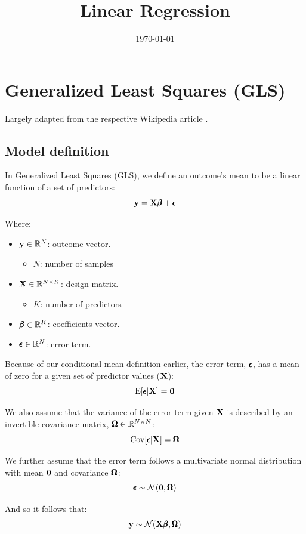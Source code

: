 \documentclass[12pt]{article}
\title{Linear Regression}
\date{\today}
\begin{document}
\maketitle

\section{Generalized Least Squares (GLS)}

Largely adapted from the respective Wikipedia article \citep{wikipedia2026webGLS}.

\subsection{Model definition}

In Generalized Least Squares (GLS), we define an outcome's mean to be a linear function of a set of predictors:
$$ \mathbf{y} = \mathbf{X} \pmb{\beta} + \pmb{\epsilon} $$

Where:

\begin{itemize}
    \item $\mathbf{y} \in \mathbb{R}^N$: outcome vector.
    \begin{itemize}
        \item $N$: number of samples
    \end{itemize}
    \item $\mathbf{X} \in \mathbb{R}^{N \times K}$: design matrix.
    \begin{itemize}
        \item $K$: number of predictors
    \end{itemize}
    \item $\pmb{\beta} \in \mathbb{R}^K$: coefficients vector.
    \item $\pmb{\epsilon} \in \mathbb{R}^N$: error term.
\end{itemize}

Because of our conditional mean definition earlier, the error term, $\pmb{\epsilon}$, has a mean of zero for a given set of predictor values ($\mathbf{X}$):
$$ \mathrm{E} [\pmb{\epsilon} | \mathbf{X} ] = \textbf{0} $$

We also assume that the variance of the error term given $\mathbf{X}$ is described by an invertible covariance matrix, $\pmb{\Omega} \in \mathbb{R}^{N \times N}$:
$$ \mathrm{Cov}[ \pmb{\epsilon} | \mathbf{X} ] = \pmb{\Omega} $$

We further assume that the error term follows a multivariate normal distribution with mean $\textbf{0}$ and covariance $\pmb{\Omega}$:
$$ \pmb{\epsilon} \sim \mathcal{N} (\textbf{0}, \pmb{\Omega}) $$

And so it follows that:
$$ \mathbf{y} \sim \mathcal{N} (\mathbf{X} \pmb{\beta}, \pmb{\Omega}) $$
\end{document}
